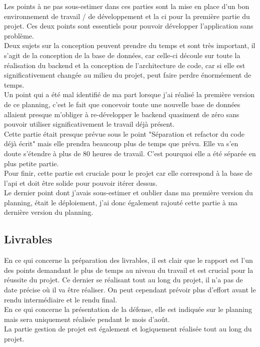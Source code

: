 \documentclass[
    iai, %
    il, %
]{heig-tb}
\begin{document}
Les points à ne pas sous-estimer dans ces parties sont la mise en place d'un bon environnement de travail / de développement et la \Gls{ci} pour la première partie du projet. Ces deux points sont essentiels pour pouvoir développer l'application sans problème.\\
Deux sujets sur la conception peuvent prendre du temps et sont très important, il s'agit de la conception de la base de données, car celle-ci découle sur toute la réalisation du \Gls{backend} et la conception de l'architecture de code, car si elle est significativement changée au milieu du projet, peut faire perdre énorméement de temps.\\
Un point qui a été mal identifié de ma part lorsque j'ai réalisé la première version de ce planning,
c'est le fait que concevoir toute une nouvelle base de données allaient presque m'obliger à
re-développer le \Gls{backend} quasiment de zéro sans pouvoir utiliser significativement le travail déjà
présent.\\
Cette partie était presque prévue sous le point "Séparation et refactor du code déjà écrit" mais
elle prendra beaucoup plus de temps que prévu. Elle va s'en doute s'étendre à plus de 80 heures de
travail. C'est pourquoi elle a été séparée en plus petite partie. \\
Pour finir, cette partie est cruciale pour le projet car elle correspond à la base de l'\Gls{api} et doit être solide pour pouvoir itérer dessus. \\
Le dernier point dont j'avais sous-estimer et oublier dans ma première version du planning, était le déploiement, j'ai donc également rajouté cette partie à ma dernière version du planning.

\subsection{Livrables}
En ce qui concerne la préparation des livrables, il est clair que le rapport est l'un des points
demandant le plus de temps au niveau du travail et est crucial pour la réussite du projet. Ce
dernier se réalisant tout au long du projet, il n'a pas de date précise où il va être réaliser. On
peut cependant prévoir plus d'effort avant le rendu intermédiaire et le rendu final.\\
En ce qui concerne la présentation de la défense, elle est indiquée sur le planning mais sera uniquement réalisée pendant le mois d'août.\\
La partie gestion de projet est également et logiquement réalisée tout au long du projet.
\end{document}
